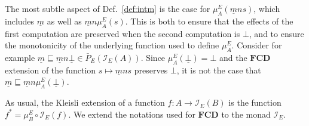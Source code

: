 \documentclass[draft,11pt]{report}
\theoremstyle{definition}
\begin{document}
%


The most subtle aspect of Def.~\ref{def:intm}
is the case for $\mu^E_A(\underline{m} n s)$,
which includes $\underline{m}$ as well as $\underline{m} n \mu^E_A(s)$.
This is both
to ensure that the effects of the first computation are preserved
when the second computation is $\bot$, and
to ensure the monotonicity of the underlying function
used to define $\mu^E_A$.
Consider for example
$\underline{m} \sqsubseteq
 \underline{m} n \underline{\bot} \in \bar{P}_E(\mathcal{I}_E(A))$.
Since $\mu^E_A(\underline{\bot}) = \bot$ and
the $\mathbf{FCD}$ extension
of the function $s \mapsto \underline{m} n s$
preserves $\bot$,
it is not the case that
$\underline{m} \sqsubseteq
 \underline{m} n \mu^E_A(\underline{\bot})$.

As usual,
the Kleisli extension of a function $f : A \rightarrow \mathcal{I}_E(B)$
is the function $f^* = \mu^E_B \circ \mathcal{I}_E(f)$.
We extend the notations used for $\mathbf{FCD}$
to the monad $\mathcal{I}_E$.

\end{document}
